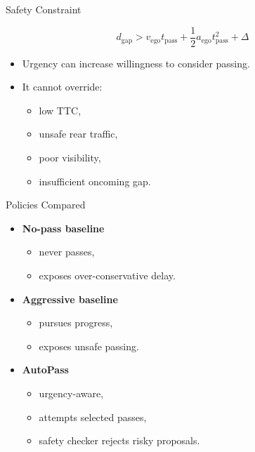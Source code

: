 \documentclass[aspectratio=169,11pt]{beamer}
\begin{document}
\begin{frame}{Safety Constraint}
\begin{center}
\Large
\[
d_{\mathrm{gap}} >
v_{\mathrm{ego}}t_{\mathrm{pass}}
+\frac{1}{2}a_{\mathrm{ego}}t_{\mathrm{pass}}^2+\Delta
\]
\end{center}

\vspace{8pt}

\begin{itemize}
\item Urgency can increase willingness to consider passing.
\item It cannot override:
\begin{itemize}
\item low TTC,
\item unsafe rear traffic,
\item poor visibility,
\item insufficient oncoming gap.
\end{itemize}
\end{itemize}
\end{frame}

\begin{frame}{Policies Compared}
\begin{itemize}
\item \textbf{No-pass baseline}
\begin{itemize}
\item never passes,
\item exposes over-conservative delay.
\end{itemize}

\pause

\item \textbf{Aggressive baseline}
\begin{itemize}
\item pursues progress,
\item exposes unsafe passing.
\end{itemize}

\pause

\item \textbf{AutoPass}
\begin{itemize}
\item urgency-aware,
\item attempts selected passes,
\item safety checker rejects risky proposals.
\end{itemize}
\end{itemize}
\end{frame}
\end{document}
